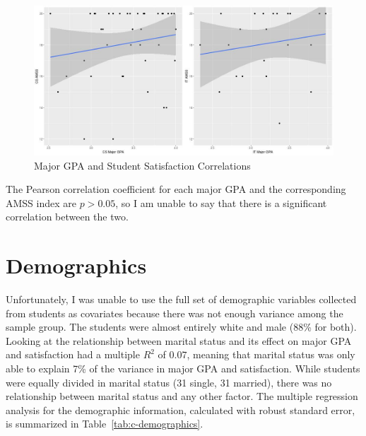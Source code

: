 \begin{figure}[!hbtp]
  \centering
  \includegraphics[width=1.05\textwidth]{figures/chapter4/major_gpa_amss_plots.jpg}
  \caption{Major GPA and Student Satisfaction Correlations}
  \label{fig:c-major_gpa_amss_plots}
\end{figure}

The Pearson correlation coefficient for each major GPA and the corresponding AMSS index are $p>0.05$, so I am unable to say that there is a significant correlation between the two.

\section{Demographics}
Unfortunately, I was unable to use the full set of demographic variables collected from students as covariates because there was not enough variance among the sample group. The students were almost entirely white and male (88\% for both). Looking at the relationship between marital status and its effect on major GPA and satisfaction had a multiple $R^2$ of $0.07$, meaning that marital status was only able to explain 7\% of the variance in major GPA and satisfaction. While students were equally divided in marital status (31 single, 31 married), there was no relationship between marital status and any other factor. The multiple regression analysis for the demographic information, calculated with robust standard error, is summarized in Table~\ref{tab:c-demographics}.

